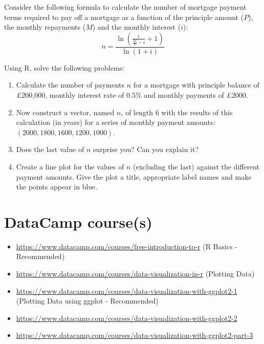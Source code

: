 \documentclass[
]{book}
\providecommand{\tightlist}{%
  \setlength{\itemsep}{0pt}\setlength{\parskip}{0pt}}
\theoremstyle{definition}
\theoremstyle{definition}
\theoremstyle{definition}
\theoremstyle{definition}
\theoremstyle{remark}
\begin{document}
Consider the following formula to calculate the number of mortgage payment terms required to pay off a mortgage as a function of the principle amount (\(P\)), the monthly repayments (\(M\)) and the monthly interest (\(i\)):
\begin{equation*}
    n = \frac{\ln\left(\frac{i}{\frac{M}{P}-i}+1 \right)}{\ln(1+i)}
\end{equation*}

Using R, solve the following problems:

\begin{enumerate}
\def\labelenumi{\arabic{enumi}.}
\tightlist
\item
  Calculate the number of payments \(n\) for a mortgage with principle balance of £200,000, monthly interest rate of \(0.5\%\) and monthly payments of £2000.
\item
  Now construct a vector, named \(n\), of length 6 with the results of this calculation (in years) for a series of monthly payment amounts: \((2000, 1800, 1600, 1200, 1000)\).
\item
  Does the last value of \(n\) surprise you? Can you explain it?
\item
  Create a line plot for the values of \(n\) (excluding the last) against the different payment amounts. Give the plot a title, appropriate label names and make the points appear in blue.
\end{enumerate}

\hypertarget{datacamp-courses}{%
\section{DataCamp course(s)}\label{datacamp-courses}}

\begin{itemize}
\tightlist
\item
  \url{https://www.datacamp.com/courses/free-introduction-to-r} (R Basics - Recommended)
\item
  \url{https://www.datacamp.com/courses/data-visualization-in-r} (Plotting Data)
\item
  \url{https://www.datacamp.com/courses/data-visualization-with-ggplot2-1} (Plotting Data using ggplot - Recommended)
\item
  \url{https://www.datacamp.com/courses/data-visualization-with-ggplot2-2}
\item
  \url{https://www.datacamp.com/courses/data-visualization-with-ggplot2-part-3}
\end{itemize}
\end{document}
